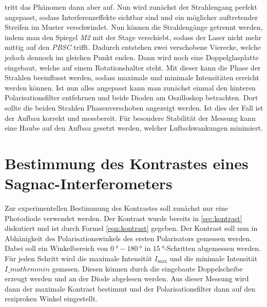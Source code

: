 tritt das Phänomen dann aber auf. Nun wird zunächst der Strahlengang perfekt angepasst, sodass Interferenzeffekte sichtbar sind und ein möglicher auftretender Streifen im Muster
verschwindet. Nun können die Strahlengänge getrennt werden, indem man den Spiegel \textit{M2} mit der Stage verschiebt, sodass der Laser nicht mehr mittig auf den \textit{PBSC} trifft.
Dadurch entstehen zwei verschobene Vierecke, welche jedoch dennoch im gleichen Punkt enden. Dann wird noch eine Doppelglasplatte eingebaut, welche auf einem Rotationshalter steht. Mit 
dieser kann die Phase der Strahlen beeinflusst werden, sodass maximale und minimale Intensitäten erreicht werden können. Ist nun alles angepasst kann man zunächst einmal den hinteren 
Polarisationsfilter entfehrnen und beide Dioden am Oszilloskop betrachten. Dort sollte die beiden Strahlen Phasenverschoben angezeigt werden. Ist dies der Fall ist der Aufbau korrekt
und messbereit. Für besondere Stabilität der Messung kann eine Haube auf den Aufbau gesetzt werden, welcher Luftschwankungen minimiert.

\section{Bestimmung des Kontrastes eines Sagnac-Interferometers}
\label{sec:kontrast}
Zur experimentellen Bestimmung des Kontrastes soll zunächst nur eine Photodiode verwendet werden. Der Kontrast wurde bereits in \autoref{sec:kontrast} diskutiert und ist durch Formel \ref{eqn:kontrast}
gegeben. Der Kontrast soll nun in Abhänigkeit des Polarisationswinkels des ersten Polarisators gemessen werden. Dabei soll ein Winkelbereich von $\qty{0}{\degree}-\qty{180}{\degree}$ in 
$\qty{15}{\degree}$-Schritten abgemessen werden. Für jeden Schritt wird die maximale Intensität $I_\mathrm{max}$ und die minimale Intensität $I\_mathrm{min}$ gemssen. Diesen können durch 
die eingebaute Doppelscheibe erzeugt werden und an der Diode abgelesen werden. Aus dieser Messung wird dann der maximale Kontrast bestimmt und der Polarisationsfilter dann auf den 
reziproken Winkel eingestellt.

